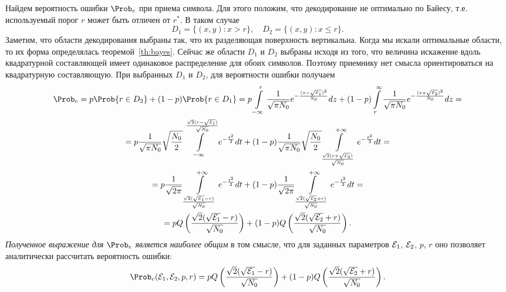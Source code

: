 \documentclass{book}
\numberwithin{theorem}{chapter}
\numberwithin{statement}{chapter}
\numberwithin{lemma}{chapter}
\theoremstyle{definition}
\numberwithin{task}{chapter}
\theoremstyle{remark}
\numberwithin{example}{chapter}
\theoremstyle{definition}
\numberwithin{definition}{chapter}
\theoremstyle{remark}
\theoremstyle{remark}
\numberwithin{lyrics}{section}
\begin{document}
Найдем вероятность ошибки $\Prob_e$ при приема символа. Для этого положим, что декодирование не оптимально по Байесу, т.е. используемый порог $r$ может быть отличен от $r^*$. В таком случае
$$D_1 = \{(x,y)\colon x > r\},\quad D_2 = \{(x,y)\colon x \le r\}.$$
Заметим, что области декодирования выбраны так, что их разделяющая поверхность вертикальна. Когда мы искали оптимальные области, то их форма определялась теоремой~\ref{th:bayes}. Сейчас же области $D_1$ и $D_2$ выбраны исходя из того, что величина искажение вдоль квадратурной составляющей имеет одинаковое распределение для обоих символов. Поэтому приемнику нет смысла ориентироваться на квадратурную составляющую. %
При выбранных $D_1$ и $D_2$, для вероятности ошибки получаем
\begin{gather*}
\Prob_e = p \Prob\{r \in D_2\} + (1 - p) \Prob\{r \in D_1\} = 
p\Int_{-\infty}^{r} \frac{1}{\sqrt{\pi N_0}} e^{-\frac{(z - \sqrt{\Energy_1})^2}{N_0}} dz + 
(1 - p)\Int_{r}^{\infty}\frac{1}{\sqrt{\pi N_0}} e^{-\frac{(z + \sqrt{\Energy_2})^2}{N_0}} dz = \\
=p\frac{1}{\sqrt{\pi N_0}}\sqrt{\frac{N_0}{2}} \Int_{-\infty}^{\frac{\sqrt{2}(r - \sqrt{\Energy_1})}{\sqrt{N_0}}} e^{-\frac{t^2}{2}}dt + 
(1 - p)\frac{1}{\sqrt{\pi N_0}}\sqrt{\frac{N_0}{2}} \Int_{\frac{\sqrt{2}(r + \sqrt{\Energy_2})}{\sqrt{N_0}}}^{+\infty} e^{-\frac{t^2}{2}}dt= \\
= p \frac{1}{\sqrt{2\pi}} \Int_{\frac{\sqrt{2}(\sqrt{\Energy_1} - r)}{\sqrt{N_0}}}^{+\infty} e^{-\frac{t^2}{2}} dt + 
(1-p) \frac{1}{\sqrt{2\pi}} \Int_{\frac{\sqrt{2}(\sqrt{\Energy_2} + r)}{\sqrt{N_0}}}^{+\infty} e^{-\frac{t^2}{2}} dt = \\
= p Q\left(\frac{\sqrt{2}(\sqrt{\Energy_1} - r)}{\sqrt{N_0}}\right) + (1 - p) Q\left(\frac{\sqrt{2}(\sqrt{\Energy_2} + r)}{\sqrt{N_0}}\right).\\
\end{gather*}
\textit{Полученное выражение для $\Prob_e$ является наиболее общим} в том смысле, что для заданных параметров $\mathcal{E}_1$, $\mathcal{E}_2$, $p$, $r$ оно позволяет аналитически рассчитать вероятность ошибки:
\begin{gather}
\label{eq:bpsk_gen_error}
\Prob_e(\Energy_1, \Energy_2, p, r)  = p Q\left(\frac{\sqrt{2}(\sqrt{\Energy_1} - r)}{\sqrt{N_0}}\right) + (1 - p) Q\left(\frac{\sqrt{2}(\sqrt{\Energy_2} + r)}{\sqrt{N_0}}\right).
\end{gather}
\end{document}
